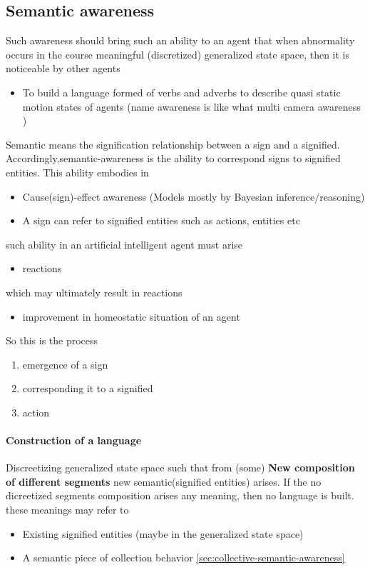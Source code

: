 \documentclass{article}
\begin{document}
		\subsection{Semantic awareness}
		Such awareness should bring such an ability to an agent that when abnormality occurs in the course meaningful (discretized) generalized state space, then it is noticeable by other agents
		\begin{itemize}
			\item To build a language formed of verbs and adverbs to describe quasi static motion states of agents (name awareness is like what multi camera awareness )
		\end{itemize}
		Semantic means the signification relationship between a sign and a signified. Accordingly,semantic-awareness is the ability to correspond signs to signified entities. This ability embodies in 
			\begin{itemize}
				\item Cause(sign)-effect awareness (Models mostly by Bayesian inference/reasoning)
				\item A sign can refer to signified entities such as actions, entities etc 
			\end{itemize}
			such ability in an artificial intelligent agent must arise 
			\begin{itemize}
				\item reactions
			\end{itemize}
			which may ultimately result in reactions
			\begin{itemize}
				\item improvement in homeostatic situation of an agent 
			\end{itemize} 
			So this is the process
			\begin{enumerate}
				\item emergence of a sign
				\item corresponding it to a signified
				\item action
			\end{enumerate}
			
			\paragraph{Construction of a language} Discreetizing generalized state space such that from (some) \textbf{New composition of different segments} new semantic(signified entities) arises. If the no dicreetized segments composition arises any meaning, then no language is built. these meanings may refer to
			\begin{itemize}
				\item Existing signified entities (maybe in the generalized state space)
				\item A semantic piece of collection behavior \ref{sec:collective-semantic-awareness} 
			\end{itemize}
		
\end{document}
